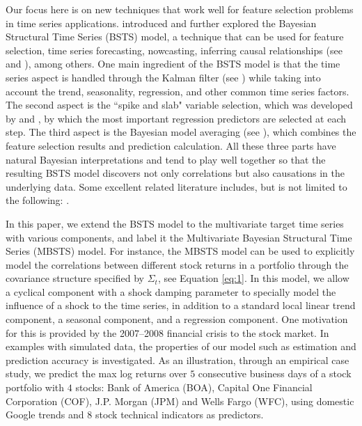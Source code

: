 \documentclass[twoside,11pt]{article}
\begin{document}
 Our focus here is on new techniques that work well for feature selection problems in time series applications. \cite{scott2014predicting, scott2015bayesian} introduced and further explored the Bayesian Structural Time Series (BSTS) model, a technique that can be used for feature selection, time series forecasting, nowcasting, inferring causal relationships (see \citealp{brodersen2015inferring} and \citealp{peters2017elements}), among others.
 One main ingredient of the BSTS model is that the time series aspect is handled through the Kalman filter (see \citealp{harvey1990forecasting, durbin2002simple, petris2009dynamic}) while taking into account the trend, seasonality, regression, and other common time series factors. The second aspect is the ``spike and slab" variable selection, which was developed by \cite{george1997approaches} and \cite{madigan1994model}, by which the most important regression predictors are selected at each step. The third aspect is the Bayesian model averaging (see \citealp{hoeting1999bayesian}), which combines the feature selection results and prediction calculation. All these three parts have natural Bayesian interpretations and tend to play well together so that the resulting BSTS model discovers not only correlations but also causations in the underlying data. Some excellent related literature includes, but is not limited to the following: \cite{dy2004feature, cortes1995support, guyon2003introduction, koo2007structured, bach2013hinge, keerthi2003asymptotic, nowozin2011structured, krishnapuram2005sparse, caron2006gps, csato2002sparse}.

In this paper, we extend the BSTS model to the multivariate target time series with various components, and label it the Multivariate Bayesian Structural Time Series (MBSTS) model.
 For instance, the MBSTS model can be used to explicitly model the correlations between different stock returns in a portfolio through the covariance structure specified by $\Sigma_t$, see Equation  \eqref{eq:1}. In this model, we allow  a cyclical component with a shock damping parameter to specially model the influence of a shock to the time series, in addition to a standard local linear trend component, a seasonal component, and a regression component. One motivation for this is provided by the 2007--2008 financial crisis to the stock market. In examples with simulated data, the properties of our model such as estimation and prediction accuracy is investigated. As an illustration, through an empirical case study, we predict the max log returns over $5$ consecutive business days of a stock portfolio with $4$ stocks: Bank of America (BOA), Capital One Financial Corporation (COF), J.P. Morgan (JPM) and Wells Fargo (WFC), using domestic Google trends and $8$ stock technical indicators as predictors.
\end{document}
